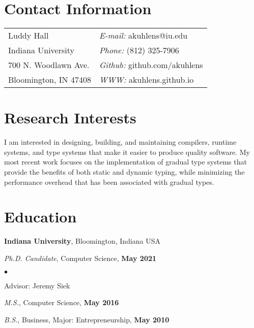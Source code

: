 \documentclass[resmargin,line]{res}
\newenvironment{list1}{
  \begin{list}{\ding{113}}{%
      \setlength{\itemsep}{0in}
      \setlength{\parsep}{0in} \setlength{\parskip}{0in}
      \setlength{\topsep}{0in} \setlength{\partopsep}{0in} 
      \setlength{\leftmargin}{0.17in}}}{\end{list}}
\newenvironment{list2}{
  \begin{list}{$\bullet$}{%
      \setlength{\itemsep}{0in}
      \setlength{\parsep}{0in} \setlength{\parskip}{0in}
      \setlength{\topsep}{0in} \setlength{\partopsep}{0in} 
      \setlength{\leftmargin}{0.2in}}}{\end{list}}
\begin{document}

\begin{resume}
\section{\sc Contact Information}
\vspace{.05in}
\begin{tabular}{@{}p{2in}p{4in}}
Luddy Hall                 & {\it E-mail:} akuhlens@iu.edu \\
Indiana University         & {\it Phone:}  (812) 325-7906 \\
700 N. Woodlawn Ave.       & {\it Github:} github.com/akuhlens  \\       
Bloomington, IN 47408      & {\it WWW:} akuhlens.github.io \\     
\end{tabular}

\section{\sc Research Interests}
I am interested in designing, building, and maintaining compilers,
runtime systems, and type systems that make it easier to produce
quality software. My most recent work focuses on the implementation of
gradual type systems that provide the benefits of both static and
dynamic typing, while minimizing the performance overhead that has
been associated with gradual types.

\section{\sc Education}
{\bf Indiana University},
Bloomington, Indiana USA\\
\vspace*{-.15in}
\begin{list1}
\item[] {\em Ph.D. Candidate}, Computer Science, \hfill {\bf May 2021}\\
  \vspace*{-.15in}
  \begin{list2}
  \item[] Advisor:  Jeremy Siek
  \end{list2}
\item[] {\em M.S.}, Computer Science,  \hfill {\bf May 2016}
\item[] {\em B.S.}, Business, Major: Entrepreneurship, \hfill{} {\bf May 2010}
\end{list1}


\end{resume}
\end{document}
